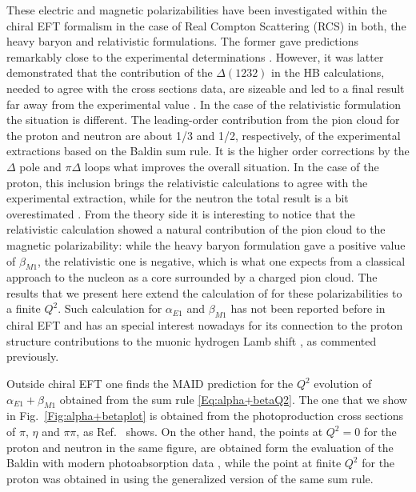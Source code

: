 \documentclass[prc,twocolumn,showpacs,preprintnumbers,amsmath,amssymb
,superscriptaddress,a4paper,nofootinbib
]{revtex4-1}
\begin{document}
These electric and magnetic polarizabilities have been investigated within the chiral EFT formalism in the case of Real Compton Scattering (RCS) in both, the heavy baryon and relativistic formulations. 
The former gave predictions remarkably close to the experimental determinations \cite{Bernard:1991rq,Bernard:1991ru}.
However, it was latter demonstrated that the contribution of the $\Delta(1232)$ in the HB calculations, needed to agree with the cross sections data, are sizeable and led to a final result far away from the experimental value \cite{Hemmert:1996rw}.
In the case of the relativistic formulation the situation is different. 
The leading-order contribution from the pion cloud for the proton and neutron are about 1/3 and 1/2, respectively, of the experimental extractions based on the Baldin sum rule\cite{Babusci:1997ij}.
It is the higher order corrections by the $\Delta$ pole and $\pi\Delta$ loops what improves the overall situation. 
In the case of the proton, this inclusion brings the relativistic calculations to agree with the experimental extraction, while for the neutron the total result is a bit overestimated \cite{Babusci:1997ij}.
From the theory side it is interesting to notice that the relativistic calculation showed a natural contribution of the pion cloud to the magnetic polarizability: while the heavy baryon formulation gave a positive value of $\beta_{M1}$, the relativistic one is negative, which is what one expects from a classical approach to the nucleon as a core surrounded by a charged pion cloud.
The results that we present here extend the calculation of \cite{Lensky:2009uv} for these polarizabilities to a finite $Q^2$. 
Such calculation for $\alpha_{E1}$ and $\beta_{M1}$ has not been reported before in chiral EFT and has an special interest nowadays for its connection to the proton structure contributions to the muonic hydrogen Lamb shift \cite{Alarcon:2013cba}, as commented previously. 

Outside chiral EFT one finds the MAID prediction for the $Q^2$ evolution of $\alpha_{E1}+\beta_{M1}$ obtained from the sum rule \eqref{Eq:alpha+betaQ2}. 
The one that we show in Fig.~\ref{Fig:alpha+betaplot} is obtained from the photoproduction cross sections of $\pi$, $\eta$ and $\pi \pi$, as Ref.~\cite{Drechsel:2002ar} shows. 
On the other hand, the points at $Q^2=0$ for the proton and neutron in the same figure, are obtained form the evaluation of the Baldin with modern photoabsorption data \cite{Babusci:1997ij}, while the point at finite $Q^2$ for the proton was obtained in \cite{Liang:2004tk} using the generalized version of the same sum rule.
\end{document}
